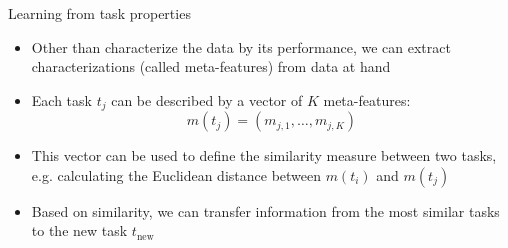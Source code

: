\begin{frame}[c]{Learning from task properties}

\begin{itemize}
    \item Other than characterize the data by its performance, we can extract characterizations (called \alert{meta-features}) from data at hand 
    \item Each task $t_j$ can be described by a vector of $K$ meta-features:
        \begin{equation*}
            m(t_j) = (m_{j, 1}, \dots, m_{j, K})
        \end{equation*}
    \item This vector can be used to define the similarity measure between two tasks, e.g. calculating the Euclidean distance between $m(t_i)$ and $m(t_j)$
    \item Based on similarity, we can transfer information from the most similar tasks to the new task $t_{\text{new}}$
    \end{itemize}

\hspace{11cm}

\end{frame}





